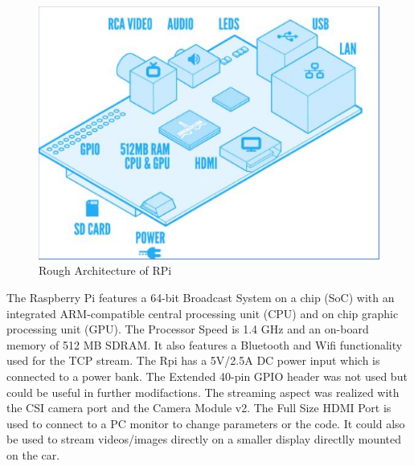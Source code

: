 \documentclass[conference]{IEEEtran}
\begin{document}
\begin{figure}[h!]
	\includegraphics[width=\linewidth]{RPiArchitecture.png}
	\caption{Rough Architecture of RPi}
	\label{fig:RPi}
\end{figure}
The Raspberry Pi features a 64-bit Broadcast System on a chip (SoC) with an integrated ARM-compatible central processing unit (CPU) and on chip graphic processing unit (GPU). The Processor Speed is 1.4 GHz and an on-board memory of 512 MB SDRAM. It also features a Bluetooth and Wifi functionality used for the TCP stream. The Rpi has a 5V/2.5A DC power input which is connected to a power bank. The Extended 40-pin GPIO header was not used but could be useful in further modifactions. The streaming aspect was realized with the CSI camera port and the Camera Module v2. The Full Size HDMI Port is used to connect to a PC monitor to change parameters or the code. It could also be used to stream videos/images  directly on a smaller display directlly mounted on the car. 
\end{document}
